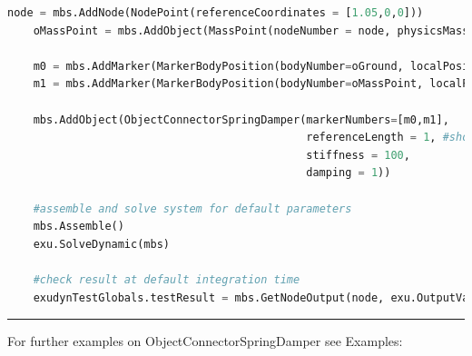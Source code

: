 \label{miniExample_ObjectConnectorSpringDamper}
\pythonstyle
\begin{lstlisting}[language=Python, firstnumber=1]
    node = mbs.AddNode(NodePoint(referenceCoordinates = [1.05,0,0]))
    oMassPoint = mbs.AddObject(MassPoint(nodeNumber = node, physicsMass=1))
    
    m0 = mbs.AddMarker(MarkerBodyPosition(bodyNumber=oGround, localPosition=[0,0,0]))
    m1 = mbs.AddMarker(MarkerBodyPosition(bodyNumber=oMassPoint, localPosition=[0,0,0]))
    
    mbs.AddObject(ObjectConnectorSpringDamper(markerNumbers=[m0,m1],
                                              referenceLength = 1, #shorter than initial distance
                                              stiffness = 100,
                                              damping = 1))

    #assemble and solve system for default parameters
    mbs.Assemble()
    exu.SolveDynamic(mbs)

    #check result at default integration time
    exudynTestGlobals.testResult = mbs.GetNodeOutput(node, exu.OutputVariableType.Position)[0]

\end{lstlisting}

\vspace{6pt}\par\noindent\rule{\textwidth}{0.4pt}
%
\noindent For further examples on ObjectConnectorSpringDamper see Examples:
\bi
\item{}\item{}\item{}\item{}\item{}\item{}\ei

